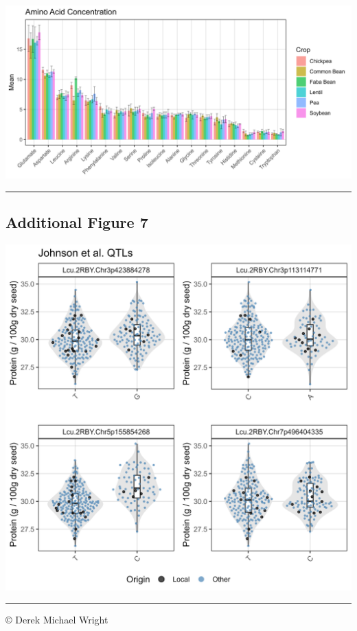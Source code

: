 \documentclass[
]{article}
\begin{document}
\includegraphics{Additional/Additional_Figure_06.jpg}

\begin{center}\rule{0.5\linewidth}{0.5pt}\end{center}

\hypertarget{additional-figure-7}{%
\subsection{Additional Figure 7}\label{additional-figure-7}}

\includegraphics{Additional/Additional_Figure_07.jpg}

\begin{center}\rule{0.5\linewidth}{0.5pt}\end{center}

© Derek Michael Wright
\end{document}
